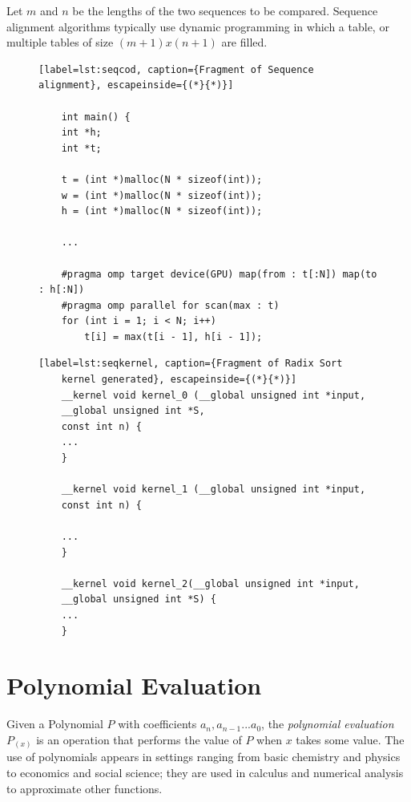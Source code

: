 \documentclass[Ingles]{ic-tese-v1}
\begin{document}
Let $m$ and $n$ be the lengths of the two sequences to be
compared. Sequence alignment algorithms typically
use dynamic programming in which a table, or multiple
tables of size $(m+1)x(n+1)$ are filled.

\begin{figure}[t]
	\lstset{basicstyle=\scriptsize}
	\begin{lstlisting}[label=lst:seqcod, caption={Fragment of Sequence alignment}, escapeinside={(*}{*)}]

	int main() {
	int *h;
	int *t;

	t = (int *)malloc(N * sizeof(int));
	w = (int *)malloc(N * sizeof(int));
	h = (int *)malloc(N * sizeof(int));

	...

	#pragma omp target device(GPU) map(from : t[:N]) map(to : h[:N])
	#pragma omp parallel for scan(max : t)
	for (int i = 1; i < N; i++)
		t[i] = max(t[i - 1], h[i - 1]);

	\end{lstlisting}
\end{figure}

\begin{figure}[t]
	\lstset{basicstyle=\scriptsize}
	\begin{lstlisting}[label=lst:seqkernel, caption={Fragment of Radix Sort
	kernel generated}, escapeinside={(*}{*)}]
	__kernel void kernel_0 (__global unsigned int *input,
	__global unsigned int *S,
	const int n) {
	...
	}

	__kernel void kernel_1 (__global unsigned int *input,
	const int n) {

	...
	}

	__kernel void kernel_2(__global unsigned int *input,
	__global unsigned int *S) {
	...
	}
	\end{lstlisting}
\end{figure}

\section{Polynomial Evaluation}
\label{sec:PolEval}

Given a Polynomial $P$ with coefficients $a_{n}, a_{n-1} ... a_{0}$, the \textit{polynomial evaluation} $P_{(x)}$ is an operation
that performs the value of $P$ when $x$ takes some value. The use of polynomials
appears in settings ranging from basic chemistry and physics to economics and social science; they are used in calculus and numerical analysis to approximate other functions.
\end{document}
